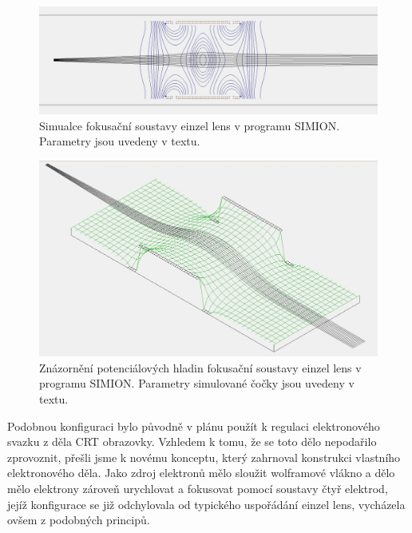
\begin{figure}[htbp!]
\centering
\includegraphics[width = \linewidth]{Figure/05/3a.jpg}
\caption[Simualce fokusační soustavy einzel lens v programu SIMION.]{Simualce fokusační soustavy einzel lens v programu SIMION. Parametry jsou uvedeny v textu.}
\label{05simulaceEinzelLens}
\end{figure}

\begin{figure}[htbp!]
\centering
\includegraphics[width = \linewidth]{Figure/05/3b.jpg}
\caption[Znázornění potenciálových hladin fokusační soustavy einzel lens v programu SIMION.]{Znázornění potenciálových hladin fokusační soustavy einzel lens v programu SIMION. Parametry simulované čočky jsou uvedeny v textu.}
\label{05simulaceEinzelLensPotencial}
\end{figure}

Podobnou konfiguraci bylo původně v plánu použít k regulaci elektronového svazku z děla CRT obrazovky. Vzhledem k tomu, že se toto dělo nepodařilo zprovoznit, přešli jsme k novému konceptu, který zahrnoval konstrukci vlastního elektronového děla. Jako zdroj elektronů mělo sloužit wolframové vlákno a dělo mělo elektrony zároveň urychlovat a fokusovat pomocí soustavy čtyř elektrod, jejíž konfigurace se již odchylovala od typického uspořádání einzel lens, vycházela ovšem z podobných principů.\\


